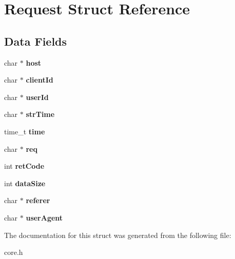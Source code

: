 \hypertarget{struct_request}{\section{Request Struct Reference}
\label{struct_request}
}
\subsection*{Data Fields}
\begin{DoxyCompactItemize}
\item 
\hypertarget{struct_request_a1c2046dcb30a629d6d9f45ff8f403f12}{char $\ast$ {\bfseries host}}\label{struct_request_a1c2046dcb30a629d6d9f45ff8f403f12}

\item 
\hypertarget{struct_request_afc6a49356b7210c7af4fdaec589c2501}{char $\ast$ {\bfseries client\-Id}}\label{struct_request_afc6a49356b7210c7af4fdaec589c2501}

\item 
\hypertarget{struct_request_ad9215e76385d60b36fa2ee2a903e8005}{char $\ast$ {\bfseries user\-Id}}\label{struct_request_ad9215e76385d60b36fa2ee2a903e8005}

\item 
\hypertarget{struct_request_aaf3a44ace5539215bc080105d7b58bca}{char $\ast$ {\bfseries str\-Time}}\label{struct_request_aaf3a44ace5539215bc080105d7b58bca}

\item 
\hypertarget{struct_request_ab842bdb7d02be824fb48613032b4ff36}{time\-\_\-t {\bfseries time}}\label{struct_request_ab842bdb7d02be824fb48613032b4ff36}

\item 
\hypertarget{struct_request_ab47351fd475e3902c6d5da9e09474834}{char $\ast$ {\bfseries req}}\label{struct_request_ab47351fd475e3902c6d5da9e09474834}

\item 
\hypertarget{struct_request_a1ff5ada708c1e7c8f38abc41907506ba}{int {\bfseries ret\-Code}}\label{struct_request_a1ff5ada708c1e7c8f38abc41907506ba}

\item 
\hypertarget{struct_request_a8c8e474bb8d2c6f7162455416b488e50}{int {\bfseries data\-Size}}\label{struct_request_a8c8e474bb8d2c6f7162455416b488e50}

\item 
\hypertarget{struct_request_a1385d5da8c765cd03076f404f49a9b2c}{char $\ast$ {\bfseries referer}}\label{struct_request_a1385d5da8c765cd03076f404f49a9b2c}

\item 
\hypertarget{struct_request_a4689522b836b1d00731611b760aab9de}{char $\ast$ {\bfseries user\-Agent}}\label{struct_request_a4689522b836b1d00731611b760aab9de}

\end{DoxyCompactItemize}


The documentation for this struct was generated from the following file\-:\begin{DoxyCompactItemize}
\item 
core.\-h\end{DoxyCompactItemize}
